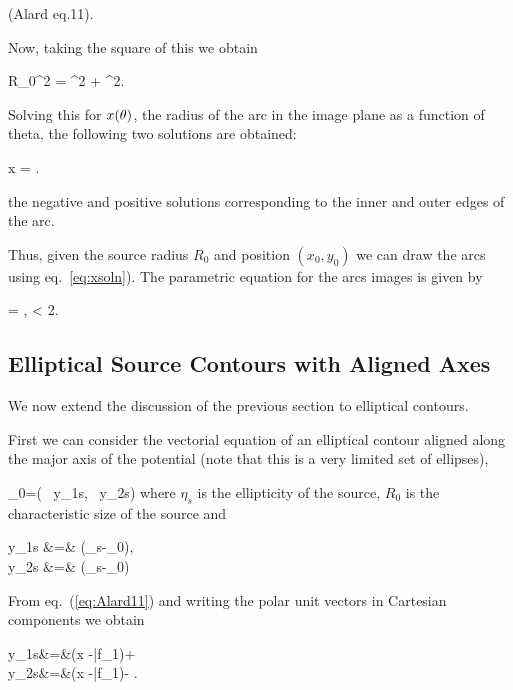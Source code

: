 (Alard eq.11).

Now, taking the square of this we obtain

\beq
R_{0}^2 = ^2 + ^2. \;\;\;
\eeq

Solving this for $x(\theta)$, the radius of the arc in the image plane as
a function of theta, the following two solutions are obtained:

\beq
\label{eq:xsoln}
x = . \;\;\;
\eeq

the negative and positive solutions corresponding to the inner and outer edges of the arc.

Thus, given the source radius $R_{0}$ and position $(x_0,y_0)$ we can
draw the arcs using eq.~\eqref{eq:xsoln}). The parametric equation for the
arcs images is given by

\beq
{}= ,  \leq \te < 2\pi.
\eeq


\subsection{Elliptical Source Contours with Aligned Axes}

We now extend the discussion of the previous section to elliptical contours.

First we can consider the vectorial equation of an elliptical contour
aligned along the major axis of the potential (note that this is a
very limited set of ellipses),

\beq
\label{eq:ellipse}
_0=\left( \, y_{1s}, \, y_{2s}\right)
\eeq
where $\eta_s$ is the ellipticity of the source, $R_0$ is the characteristic size of the source
and
 
\bea
y_{1s} &=& (_s-_0)\cdot{}, \\
y_{2s} &=& (_s-_0)\cdot{}
\eea

From eq.~(\ref{eq:Alard11}) and writing the polar unit vectors in Cartesian components we obtain

\bea
y_{1s}&=&(\kt x -\bar{f}_1)\cos{\te}+\sin{\te} \label{y_1s}\\
y_{2s}&=&(\kt x -\bar{f}_1)\sin{\te}-\cos{\te} \label{y_2s}.
\eea

